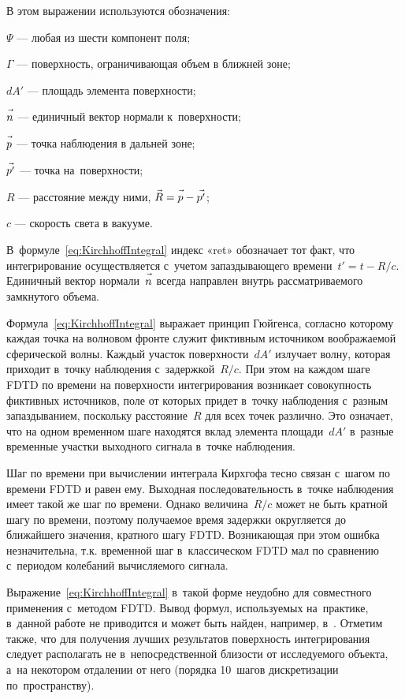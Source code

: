 \noindent
В этом выражении используются обозначения:
\begin{where}
\item $\Psi$ --- любая из шести компонент поля;
\item $\Gamma$ --- поверхность, ограничивающая объем в ближней зоне;
\item $dA'$ --- площадь элемента поверхности;
\item $\vec{n\mathstrut}$ --- единичный вектор нормали к~поверхности;
\item $\vec{p\mathstrut}$ --- точка наблюдения в дальней зоне;
\item $\vec{p'\mathstrut}$ --- точка на~поверхности;
\item $R$ --- расстояние между ними, $\vec{R\mathstrut} = \vec{p\mathstrut}-\vec{p'\mathstrut}$;
\item $c$ --- скорость света в вакууме.
\end{where}

\noindent
В~формуле~\eqref{eq:KirchhoffIntegral} индекс «ret» обозначает тот факт, что
интегрирование осуществляется с~учетом запаздывающего времени~$t'=t-R/c$.
Единичный вектор нормали~$\vec{n\mathstrut}$ всегда направлен внутрь рассматриваемого
замкнутого объема.

Формула~\eqref{eq:KirchhoffIntegral} выражает принцип Гюйгенса, согласно
которому каждая точка на волновом фронте служит фиктивным источником
воображаемой сферической волны. Каждый участок поверхности~$dA'$ излучает волну,
которая приходит в~точку наблюдения с~задержкой~$R/c$. При этом на каждом шаге
FDTD по времени на поверхности интегрирования возникает совокупность фиктивных
источников, поле от которых придет в~точку наблюдения с~разным запаздыванием,
поскольку расстояние~$R$ для всех точек различно. Это означает, что на одном
временном шаге находятся вклад элемента площади~$dA'$ в~разные временные участки
выходного сигнала в~точке наблюдения.

Шаг по времени при вычислении интеграла Кирхгофа тесно связан с~шагом по времени
FDTD и равен ему. Выходная последовательность в~точке наблюдения имеет такой же
шаг по времени. Однако величина~$R/c$ может не быть кратной шагу по времени,
поэтому получаемое время задержки округляется до ближайшего значения, кратного
шагу FDTD. Возникающая при этом ошибка незначительна, т.к. временной шаг
в~классическом FDTD мал по сравнению с~периодом колебаний вычисляемого сигнала.

Выражение~\eqref{eq:KirchhoffIntegral} в~такой форме неудобно для совместного
применения с~методом FDTD. Вывод формул, используемых на~практике, в~данной
работе не приводится и может быть найден, например, в~\cite{bib:Zelenin2006}.
Отметим также, что для получения лучших результатов поверхность интегрирования
следует располагать не в~непосредственной близости от исследуемого объекта, а~на
некотором отдалении от него (порядка 10~шагов дискретизации по~пространству).

